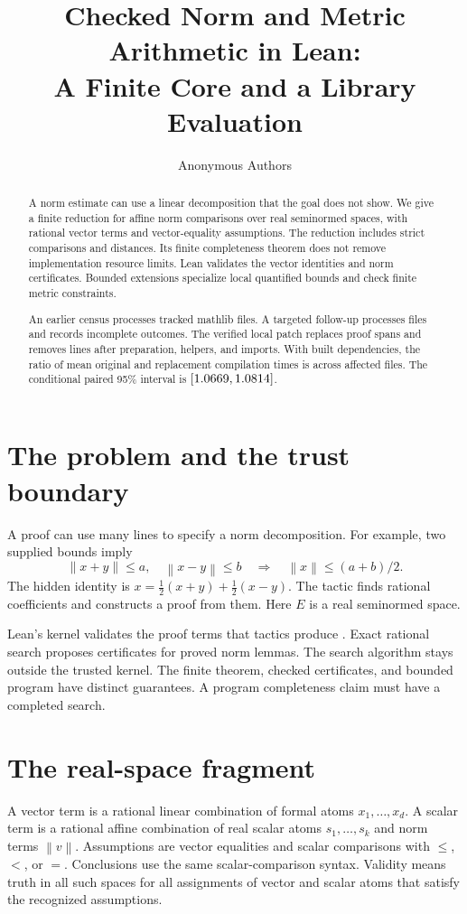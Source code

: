 \documentclass{article}
\title{Checked Norm and Metric Arithmetic in Lean:\\A Finite Core and a Library Evaluation}
\author{Anonymous Authors}
\date{}
\newcommand{\norm}[1]{\left\lVert#1\right\rVert}
\begin{document}
\maketitle
\begin{abstract}
A norm estimate can use a linear decomposition that the goal does not show.
We give a finite reduction for affine norm comparisons over real seminormed spaces, with rational vector terms and vector-equality assumptions.
The reduction includes strict comparisons and distances.
Its finite completeness theorem does not remove implementation resource limits.
Lean validates the vector identities and norm certificates.
Bounded extensions specialize local quantified bounds and check finite metric constraints.

An earlier census processes \CensusFiles{} tracked mathlib files.
A targeted follow-up processes \FollowupFiles{} files and records \FollowupFailed{} incomplete outcomes.
The verified local patch replaces \PatchReplacements{} proof spans and removes \PatchNetSaved{} lines after preparation, helpers, and imports.
With built dependencies, the ratio of mean original and replacement compilation times is \StudyRatio{} across \PatchFiles{} affected files.
The conditional paired 95\% interval is $[1.0669{},1.0814{}]$.
\end{abstract}

\section{The problem and the trust boundary}
\label{sec:problem}
A proof can use many lines to specify a norm decomposition.
For example, two supplied bounds imply
\[
 \norm{x+y}\le a,\quad \norm{x-y}\le b
 \quad\Longrightarrow\quad
 \norm{x}\le (a+b)/2.
\]
The hidden identity is $x=\frac12(x+y)+\frac12(x-y)$.
The tactic finds rational coefficients and constructs a proof from them.
Here $E$ is a real seminormed space.


Lean's kernel validates the proof terms that tactics produce \citep{lean4}.
Exact rational search proposes certificates for proved norm lemmas.
The search algorithm stays outside the trusted kernel.
The finite theorem, checked certificates, and bounded program have distinct guarantees.
A program completeness claim must have a completed search.


\section{The real-space fragment}
\label{sec:fragment}
A vector term is a rational linear combination of formal atoms $x_1,\ldots,x_d$.
A scalar term is a rational affine combination of real scalar atoms $s_1,\ldots,s_k$ and norm terms $\norm{v}$.
Assumptions are vector equalities and scalar comparisons with $\le$, $<$, or $=$.
Conclusions use the same scalar-comparison syntax.
Validity means truth in all such spaces for all assignments of vector and scalar atoms that satisfy the recognized assumptions.
\end{document}
